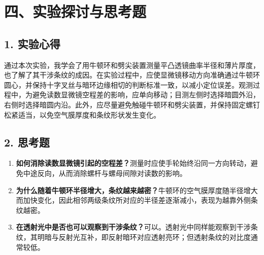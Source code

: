 \section*{四、实验探讨与思考题}

\subsection*{1. 实验心得}

通过本次实验，我学会了用牛顿环和劈尖装置测量平凸透镜曲率半径和薄片厚度，也了解了其干涉条纹的成因。在实验过程中，应使显微镜移动方向准确通过牛顿环圆心，并保持十字叉丝与暗环边缘相切的判断标准一致，以减小定位误差。观测过程中，为避免读数显微镜空程差的影响，应单向移动；目测左侧时选择暗圆外沿，右侧时选择暗圆内沿。此外，应尽量避免触碰牛顿环和劈尖装置，并保持固定螺钉松紧适当，以免空气膜厚度和条纹形状发生变化。

\subsection*{2. 思考题}

\begin{enumerate}[itemsep=0.2em, topsep=0.3em]
  \item \textbf{如何消除读数显微镜引起的空程差？}测量时应使手轮始终沿同一方向转动，避免中途反向，从而消除螺杆与螺母间隙对读数的影响。
  \item \textbf{为什么随着牛顿环半径增大，条纹越来越密？}牛顿环的空气膜厚度随半径增大而加快变化，因此相邻两级条纹所对应的半径差逐渐减小，表现为越靠外侧条纹越密。
  \item \textbf{在透射光中是否也可以观察到干涉条纹？}可以。透射光中同样能观察到干涉条纹，其明暗与反射光互补，即反射暗环对应透射亮环；但透射条纹的对比度通常较低。
\end{enumerate}
